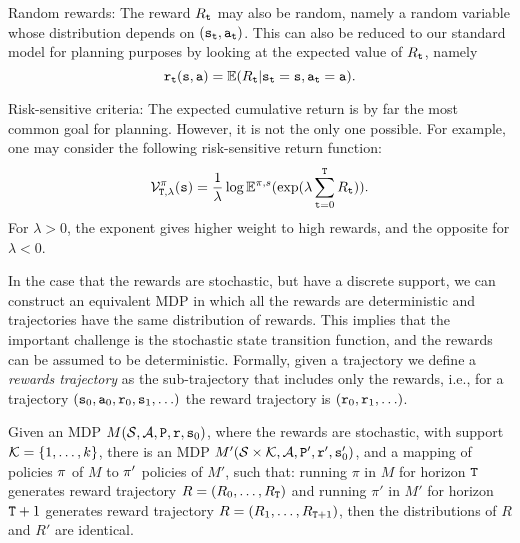\begin{remark}
    Random rewards:  The reward ${R_{\tt t}}$ may also be random, namely a random variable whose distribution depends on $({{\tt s}_{\tt t}},{{\tt a}_{\tt t}})$.  This can also be reduced to our standard model for planning purposes by looking at the expected value of ${R_{\tt t}}$, namely \[{{\tt r}_{\tt t}}({\tt s},{\tt a}) = \mathbb{E}({R_{\tt t}}|{{\tt s}_{\tt t}} = {\tt s},{{\tt a}_{\tt t}} =
  {\tt a}).\]
\end{remark}

\begin{remark}
    Risk-sensitive criteria: The expected cumulative return is by far the most common goal for planning. However, it is not the only one possible. For example, one may consider the following risk-sensitive  return function:
\[\mathcal{V}_{{{\tt T},\lambda }}^\pi ({\tt s}) = \frac{1}{\lambda }\log {\ensuremath{\mathbb{E}}^{\pi,s}}(\exp (\lambda \sum\limits_{{\tt t} = 0}^{\tt T} {{R_{\tt t}}} )).\]
For $\lambda  > 0$, the exponent gives higher weight to high rewards, and the opposite for $\lambda  < 0$.
\end{remark}


In the case that the rewards are stochastic, but have a discrete
support, we can construct an equivalent MDP in which all the rewards
are deterministic and trajectories have the same distribution of rewards. This
implies that the important challenge is the stochastic state
transition function, and the rewards can be assumed to be
deterministic.
%
Formally, given a trajectory we define a {\em rewards trajectory} as
the sub-trajectory that includes only the rewards, i.e., for a trajectory $({\tt s}_0,{\tt a}_0,{\tt r}_0,{\tt s}_1, \ldots)$ the reward trajectory is  $({\tt r}_0, {\tt r}_1, \ldots)$.



\begin{theorem}
\label{thm:K-rewards}
%
 Given an MDP $M(\mathcal{S},\mathcal{A},{\tt P},{\tt r},{\tt s}_0)$,
where the rewards are stochastic, with support ${\cal
K}=\{1,\ldots,k\}$, there is an MDP $M'(\mathcal{S}\times {\cal
K},\mathcal{A},{\tt P}',{\tt r}',{\tt s}_0')$, and a mapping of
policies $\pi$ of $M$ to $\pi'$ policies of $M'$, such that:
running $\pi$ in $M$ for horizon ${\tt T}$ generates reward
trajectory $R=(R_0, \ldots , R_{{\tt T}})$ and running $\pi'$ in
$M'$ for horizon ${\tt T}+1$ generates reward trajectory $R=(R_1,
\ldots , R_{{\tt T}+1})$, then the distributions of $R$ and $R'$
are identical.
\end{theorem}

